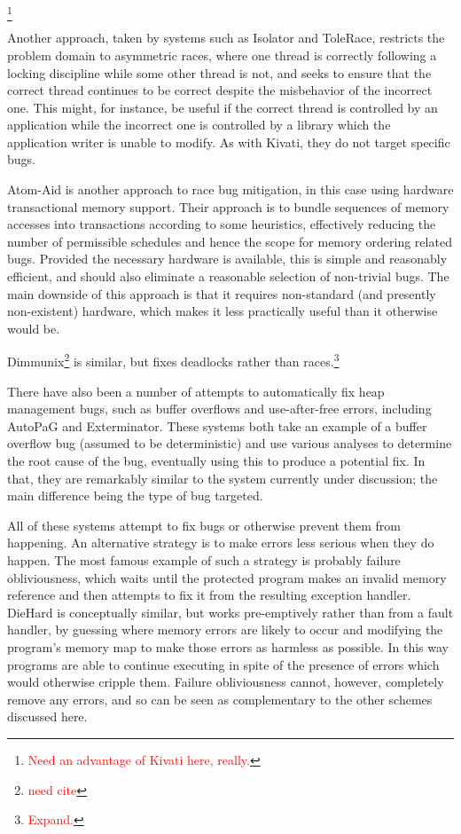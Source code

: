 \documentclass[10pt,twocolumn,preprint,natbib,authoryear]{sigplanconf}
\newcommand{\editorial}[1]{\textcolor{red}{\footnote{\textcolor{red}{#1}}}}
\newcommand{\needCite}{\editorial{need cite}}
\begin{document}
\editorial{Need an advantage of Kivati here, really.}

Another approach, taken by systems such as Isolator
\cite{Ramalingam2009} and ToleRace\cite{Ratanaworabhan2008}, restricts
the problem domain to asymmetric races, where one thread is correctly
following a locking discipline while some other thread is not, and
seeks to ensure that the correct thread continues to be correct
despite the misbehavior of the incorrect one.  This might, for
instance, be useful if the correct thread is controlled by an
application while the incorrect one is controlled by a library which
the application writer is unable to modify.  As with Kivati, they do
not target specific bugs.

Atom-Aid\cite{Lucia2009} is another approach to race bug
mitigation, in this case using hardware transactional memory support.
Their approach is to bundle sequences of memory accesses into
transactions according to some heuristics, effectively reducing the
number of permissible schedules and hence the scope for memory
ordering related bugs.  Provided the necessary hardware is available,
this is simple and reasonably efficient, and should also eliminate a
reasonable selection of non-trivial bugs.  The main downside of this
approach is that it requires non-standard (and presently non-existent)
hardware, which makes it less practically useful than it otherwise
would be.

Dimmunix\needCite{} is similar, but fixes deadlocks rather than
races.\editorial{Expand.}

There have also been a number of attempts to automatically fix heap
management bugs, such as buffer overflows and use-after-free errors,
including AutoPaG\cite{Lin2007} and Exterminator\cite{Novark2007}.
These systems both take an example of a buffer overflow bug (assumed
to be deterministic) and use various analyses to determine the root
cause of the bug, eventually using this to produce a potential fix.
In that, they are remarkably similar to the system currently under
discussion; the main difference being the type of bug targeted.

All of these systems attempt to fix bugs or otherwise prevent them
from happening.  An alternative strategy is to make errors less
serious when they do happen.  The most famous example of such a
strategy is probably failure obliviousness\cite{Rinard2004}, which
waits until the protected program makes an invalid memory reference
and then attempts to fix it from the resulting exception handler.
DieHard\cite{Berger2006} is conceptually similar, but works
pre-emptively rather than from a fault handler, by guessing where
memory errors are likely to occur and modifying the program's memory
map to make those errors as harmless as possible.  In this way
programs are able to continue executing in spite of the presence of
errors which would otherwise cripple them.  Failure obliviousness
cannot, however, completely remove any errors, and so can be seen as
complementary to the other schemes discussed here.
\end{document}
